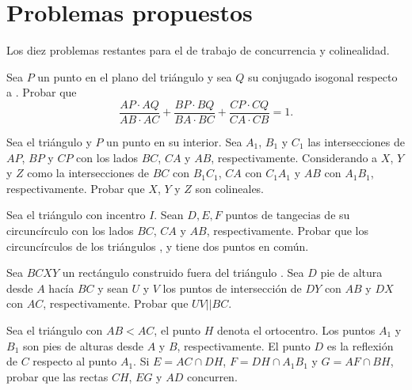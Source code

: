 \section{Problemas propuestos}

Los diez problemas restantes para el de trabajo de concurrencia y colinealidad.

\begin{section-problem}
    Sea $P$ un punto en el plano del triángulo  y sea $Q$ su conjugado isogonal respecto a .
    Probar que
    \[
        \frac{AP \cdot AQ}{AB \cdot AC} + \frac{BP \cdot BQ}{BA \cdot BC} + \frac{CP \cdot CQ}{CA \cdot CB} = 1.
    \]
\end{section-problem}

\begin{section-problem}
    Sea el triángulo  y $P$ un punto en su interior.
    Sea $A_1$, $B_1$ y $C_1$ las intersecciones de $AP$, $BP$ y $CP$ con los lados $BC$, $CA$ y $AB$, respectivamente.
    Considerando a $X$, $Y$ y $Z$ como la intersecciones de $BC$ con $B_1 C_1$, $CA$ con $C_1 A_1$ y $AB$ con $A_1 B_1$, respectivamente.
    Probar que $X$, $Y$ y $Z$ son colineales.
\end{section-problem}

\begin{section-problem}
    Sea el triángulo  con incentro $I$.
    Sean $D, E, F$ puntos de tangecias de su circuncírculo con los lados $BC$, $CA$ y $AB$, respectivamente.
    Probar que los circuncírculos de los triángulos ,  y  tiene dos puntos en común.
\end{section-problem}

\begin{section-problem}
    Sea $BCXY$ un rectángulo construido fuera del triángulo .
    Sea $D$ pie de altura desde $A$ hacía $BC$ y sean $U$ y $V$ los puntos de intersección de $DY$ con $AB$ y $DX$ con $AC$, respectivamente.
    Probar que $UV || BC$.
\end{section-problem}

\begin{section-problem}
    Sea el triángulo  con $AB < AC$, el punto $H$ denota el ortocentro.
    Los puntos $A_1$ y $B_1$ son pies de alturas desde $A$ y $B$, respectivamente.
    El punto $D$ es la reflexión de $C$ respecto al punto $A_1$.
    Si $E = AC \cap DH$, $F = DH \cap A_1 B_1$ y $G = AF \cap BH$, probar que las rectas $CH$, $EG$ y $AD$ concurren.
\end{section-problem}


